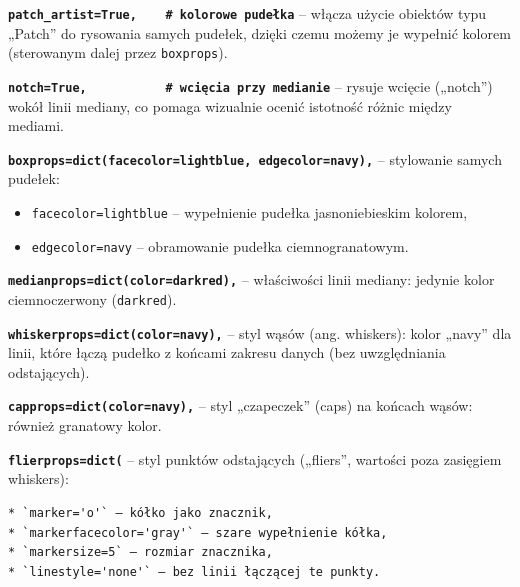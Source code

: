 \documentclass[
  polish,
  letterpaper,
  DIV=11,
  numbers=noendperiod]{scrreprt}
\newcounter{none} %
\providecommand{\tightlist}{%
  \setlength{\itemsep}{0pt}\setlength{\parskip}{0pt}}
\begin{document}
\textbf{\texttt{patch\_artist=True,\ \ \ \ \#\ kolorowe\ pudełka}} --
włącza użycie obiektów typu „Patch'' do rysowania samych pudełek, dzięki
czemu możemy je wypełnić kolorem (sterowanym dalej przez
\texttt{boxprops}).

\textbf{\texttt{notch=True,\ \ \ \ \ \ \ \ \ \ \ \#\ wcięcia\ przy\ medianie}}
-- rysuje wcięcie („notch'') wokół linii mediany, co pomaga wizualnie
ocenić istotność różnic między mediami.

\textbf{\texttt{boxprops=dict(facecolor=\textquotesingle{}lightblue\textquotesingle{},\ edgecolor=\textquotesingle{}navy\textquotesingle{}),}}
-- stylowanie samych pudełek:

\begin{itemize}
\tightlist
\item
  \texttt{facecolor=\textquotesingle{}lightblue\textquotesingle{}} --
  wypełnienie pudełka jasnoniebieskim kolorem,
\item
  \texttt{edgecolor=\textquotesingle{}navy\textquotesingle{}} --
  obramowanie pudełka ciemnogranatowym.
\end{itemize}

\textbf{\texttt{medianprops=dict(color=\textquotesingle{}darkred\textquotesingle{}),}}
-- właściwości linii mediany: jedynie kolor ciemnoczerwony
(\texttt{darkred}).

\textbf{\texttt{whiskerprops=dict(color=\textquotesingle{}navy\textquotesingle{}),}}
-- styl wąsów (ang. whiskers): kolor „navy'' dla linii, które łączą
pudełko z końcami zakresu danych (bez uwzględniania odstających).

\textbf{\texttt{capprops=dict(color=\textquotesingle{}navy\textquotesingle{}),}}
-- styl „czapeczek'' (caps) na końcach wąsów: również granatowy kolor.

\textbf{\texttt{flierprops=dict(}} -- styl punktów odstających
(„fliers'', wartości poza zasięgiem whiskers):

\begin{verbatim}
* `marker='o'` – kółko jako znacznik,
* `markerfacecolor='gray'` – szare wypełnienie kółka,
* `markersize=5` – rozmiar znacznika,
* `linestyle='none'` – bez linii łączącej te punkty.
\end{verbatim}
\end{document}
